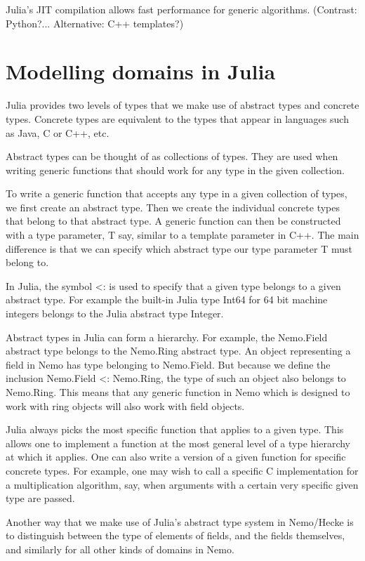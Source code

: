 \documentclass{sig-alternate-05-2015}
\begin{document}
Julia's JIT compilation allows fast performance for
generic algorithms. (Contrast: Python?... Alternative: C++ templates?)

\section{Modelling domains in Julia}

Julia provides two levels of types that we make use of abstract types and concrete types.
Concrete types are equivalent to the types that appear in languages such as Java, C or C++,
etc.

Abstract types can be thought of as collections of types. They are used when writing generic
functions that should work for any type in the given collection.

To write a generic function that accepts any type in a given collection of types, we first
create an abstract type. Then we create the individual concrete types that belong to that
abstract type. A generic function can then be constructed with a type parameter, T
say, similar to a template parameter in C++. The main difference is that we can specify
which abstract type our type parameter T must belong to.

In Julia, the symbol <: is used to specify that a given type belongs to a given abstract type.
For example the built-in Julia type Int64 for 64 bit machine integers belongs to the Julia
abstract type Integer.

Abstract types in Julia can form a hierarchy. For example, the Nemo.Field abstract type belongs
to the Nemo.Ring abstract type. An object representing a field in Nemo has type belonging to
Nemo.Field. But because we define the inclusion Nemo.Field <: Nemo.Ring, the type of such an
object also belongs to Nemo.Ring. This means that any generic function in Nemo which is designed
to work with ring objects will also work with field objects.

Julia always picks the most specific function that applies to a given type. This allows one to
implement a function at the most general level of a type hierarchy at which it applies. One can
also write a version of a given function for specific concrete types. For example, one may wish
to call a specific C implementation for a multiplication algorithm, say, when arguments with a
certain very specific given type are passed.

Another way that we make use of Julia's abstract type system in Nemo/Hecke is to distinguish
between the type of elements of fields, and the fields themselves, and similarly for all other
kinds of domains in Nemo. 
\end{document}
